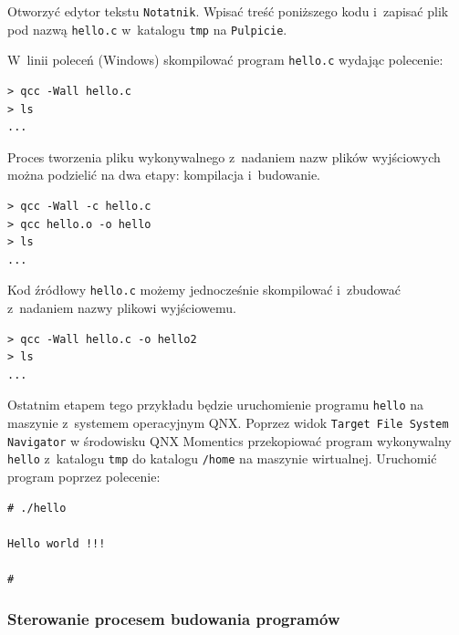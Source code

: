 \begin{example} \label{ex:pierwszy}

Otworzyć edytor tekstu \lstinline[style=MyBashStyle]{Notatnik}. Wpisać treść poniższego kodu i~zapisać plik pod nazwą \lstinline[style=MyBashStyle]{hello.c} w~katalogu \lstinline[style=MyBashStyle]{tmp} na \lstinline[style=MyBashStyle]{Pulpicie}.



W~linii poleceń (Windows) skompilować program \lstinline[style=MyBashStyle]{hello.c} wydając polecenie:

\begin{lstlisting}[style=MyBashStyle]
> qcc -Wall hello.c
> ls
...
\end{lstlisting}

Proces tworzenia pliku wykonywalnego z~nadaniem nazw plików wyjściowych można podzielić na dwa etapy: kompilacja i~budowanie.

\begin{lstlisting}[style=MyBashStyle]
> qcc -Wall -c hello.c
> qcc hello.o -o hello
> ls
...
\end{lstlisting}

Kod źródłowy \lstinline[style=MyBashStyle]{hello.c} możemy jednocześnie skompilować i~zbudować z~nadaniem nazwy plikowi wyjściowemu.

\begin{lstlisting}[style=MyBashStyle]
> qcc -Wall hello.c -o hello2
> ls
...
\end{lstlisting}

Ostatnim etapem tego przykładu będzie uruchomienie programu \lstinline[style=MyBashStyle]{hello} na maszynie z~systemem operacyjnym QNX. Poprzez widok \lstinline[style=MyBashStyle]{Target File System Navigator} w środowisku QNX Momentics przekopiować program wykonywalny \lstinline[style=MyBashStyle]{hello} z~katalogu \lstinline[style=MyBashStyle]{tmp} do katalogu \lstinline[style=MyBashStyle]{/home} na maszynie wirtualnej. Uruchomić program poprzez polecenie:

\begin{lstlisting}[style=MyBashStyle]
# ./hello

Hello world !!!

#
\end{lstlisting}
\end{example}

\subsubsection{Sterowanie procesem budowania programów}

